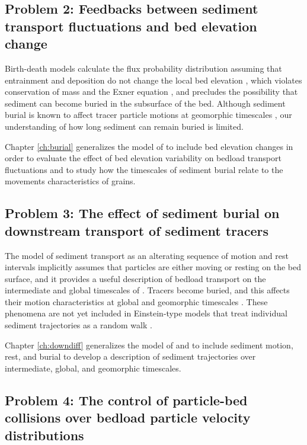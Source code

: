 \subsection{Problem 2: Feedbacks between sediment transport fluctuations and bed elevation change}

Birth-death models calculate the flux probability distribution assuming that entrainment and deposition do not change the local bed elevation \citep{Ancey2008,Heyman2013,Ancey2014}, which violates conservation of mass and the Exner equation \citep{Exner1925,Tsujimoto1978}, and precludes the possibility that sediment can become buried in the subsurface of the bed.
Although sediment burial is known to affect tracer particle motions at geomorphic timescales \citep{Ferguson2002,Hassan2017}, our understanding of how long sediment can remain buried is limited.

Chapter \ref{ch:burial} generalizes the model of \citet{Ancey2008} to include bed elevation changes in order to evaluate the effect of bed elevation variability on bedload transport fluctuations and to study how the timescales of sediment burial relate to the movements characteristics of grains.

\subsection{Problem 3: The effect of sediment burial on downstream transport of sediment tracers}

The model of sediment transport as an alterating sequence of motion and rest intervals implicitly assumes that particles are either moving or resting on the bed surface, and it provides a useful description of bedload transport on the intermediate and global timescales of \citet{Nikora2001,Nikora2002}.
Tracers become buried, and this affects their motion characteristics at global and geomorphic timescales \citep{Hassan2017}. These phenomena are not yet included in Einstein-type models that treat individual sediment trajectories as a random walk \citep[e.g.][]{Lisle1998}.

Chapter \ref{ch:downdiff} generalizes the model of \citet{Lisle1998} and \citet{Lajeunesse2017} to include sediment motion, rest, and burial to develop a description of sediment trajectories over intermediate, global, and geomorphic timescales.

\subsection{Problem 4: The control of particle-bed collisions over bedload particle velocity distributions}

